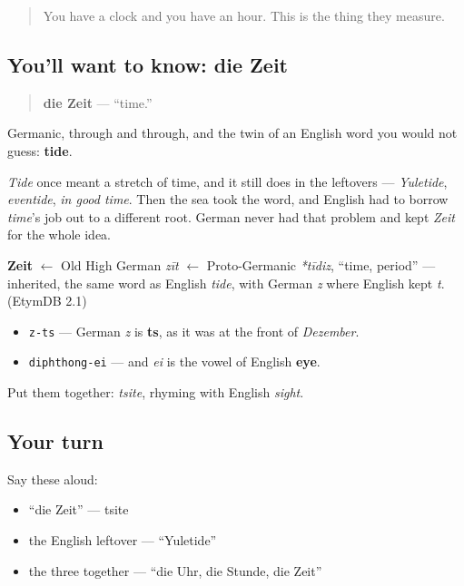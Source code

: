 \label{lesson:GE-C09-zeit}



\begin{quote}
You have a clock and you have an hour. This is the thing they measure.
\end{quote}

\subsection*{You'll want to know: die Zeit}
\begin{quote}
\textbf{die Zeit} — \textquotedblleft{}time.\textquotedblright{}
\end{quote}

Germanic, through and through, and the twin of an English word you would not guess: \textbf{tide}.

\emph{Tide} once meant a stretch of time, and it still does in the leftovers — \emph{Yuletide}, \emph{eventide}, \emph{in good time}. Then the sea took the word, and English had to borrow \emph{time}'s job out to a different root. German never had that problem and kept \emph{Zeit} for the whole idea.

\begin{cousinweb}
\textbf{Zeit} $\leftarrow$ Old High German \emph{zīt} $\leftarrow$ Proto-Germanic \emph{*tīdiz}, \textquotedblleft{}time, period\textquotedblright{} — inherited, the same word as English \emph{tide}, with German \emph{z} where English kept \emph{t}. (EtymDB 2.1)
\end{cousinweb}

\begin{sounds}
\begin{itemize}
\raggedright
  \item \texttt{z-ts} — German \emph{z} is \textbf{ts}, as it was at the front of \emph{Dezember}.
  \item \texttt{diphthong-ei} — and \emph{ei} is the vowel of English \textbf{eye}.
\end{itemize}

Put them together: \emph{tsite}, rhyming with English \emph{sight}.
\end{sounds}

\subsection*{Your turn}
Say these aloud:

\begin{itemize}
\raggedright
  \item \textquotedblleft{}die Zeit\textquotedblright{} — tsite
  \item the English leftover — \textquotedblleft{}Yuletide\textquotedblright{}
  \item the three together — \textquotedblleft{}die Uhr, die Stunde, die Zeit\textquotedblright{}
\end{itemize}

